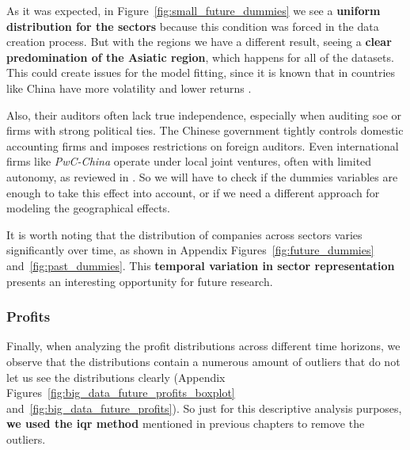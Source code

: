 \documentclass[11pt,english,a4paper,hidelinks]{book}
\begin{document}
\noindent As it was expected, in Figure~\ref{fig:small_future_dummies} we see a \textbf{uniform distribution for the sectors} because this condition was forced in the data creation process. But with the regions we have a different result, seeing a \textbf{clear predomination of the Asiatic region}, which happens for all of the datasets. This could create issues for the model fitting, since it is known that in countries like China have more volatility and lower returns \textcite{chen2024economic}.

\vspace{0.5cm}
\noindent Also, their auditors often lack true independence, especially when auditing \gls{soe} or firms with strong political ties. The Chinese government tightly controls domestic accounting firms and imposes restrictions on foreign auditors. Even international firms like \textit{PwC-China} operate under local joint ventures, often with limited autonomy, as reviewed in \textcite{LIU2012782}. So we will have to check if the dummies variables are enough to take this effect into account, or if we need a different approach for modeling the geographical effects.

\vspace{0.5cm}
\noindent It is worth noting that the distribution of companies across sectors varies significantly over time, as shown in Appendix Figures~\ref{fig:future_dummies} and~\ref{fig:past_dummies}. This \textbf{temporal variation in sector representation} presents an interesting opportunity for future research.

\newpage

\subsubsection{Profits}

\noindent Finally, when analyzing the profit distributions across different time horizons, we observe that the distributions contain a numerous amount of outliers that do not let us see the distributions clearly (Appendix Figures~\ref{fig:big_data_future_profits_boxplot} and~\ref{fig:big_data_future_profits}). So just for this descriptive analysis purposes, \textbf{we used the \acrshort{iqr} method} mentioned in previous chapters to remove the outliers.
\end{document}
